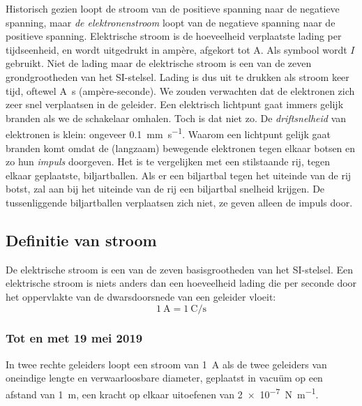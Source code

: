 Historisch gezien loopt de stroom van de positieve spanning naar de negatieve spanning, maar \textsl{de elektronenstroom} loopt van de negatieve spanning naar de positieve spanning. Elektrische stroom is de hoeveelheid verplaatste lading per tijdseenheid, en wordt uitgedrukt in ampère, afgekort tot \si{\ampere}. Als symbool wordt $I$ gebruikt. Niet de lading maar de elektrische stroom is een van de zeven grondgrootheden van het SI-stelsel. Lading is dus uit te drukken als stroom keer tijd, oftewel \si{\ampere\second} (ampère-seconde). We zouden verwachten dat de elektronen zich zeer snel verplaatsen in de geleider. Een elektrisch lichtpunt gaat immers gelijk branden als we de schakelaar omhalen. Toch is dat niet zo. De \textsl{driftsnelheid} van elektronen is klein: ongeveer \SI[per-mode=symbol]{0,1}{\milli\meter\per\second}. Waarom een lichtpunt gelijk gaat branden komt omdat de (langzaam) bewegende elektronen tegen elkaar botsen en zo hun \textsl{impuls} doorgeven. Het is te vergelijken met een stilstaande rij, tegen elkaar geplaatste, biljartballen. Als er een biljartbal tegen het uiteinde van de rij botst, zal aan bij het uiteinde van de rij een biljartbal snelheid krijgen. De tussenliggende biljartballen verplaatsen zich niet, ze geven alleen de impuls door. 









\subsection{Definitie van stroom}
De elektrische stroom is een van de zeven basisgrootheden van het SI-stelsel. Een elektrische stroom is niets anders dan een hoeveelheid lading die per seconde door het oppervlakte van de dwarsdoorsnede van een geleider vloeit:
%
\begin{equation}
\SI{1}{\ampere} = \SI[per-mode=fraction]{1}{\coulomb\per\second}
\end{equation} 

\subsubsection*{Tot en met 19 mei 2019}
In twee rechte geleiders loopt een stroom van \SI{1}{\ampere} als de twee geleiders van oneindige lengte en verwaarloosbare diameter, geplaatst in vacuüm op een afstand van \SI{1}{\meter}, een kracht op elkaar uitoefenen van \SI[per-mode=symbol]{2e-7}{\newton\per\meter}.

